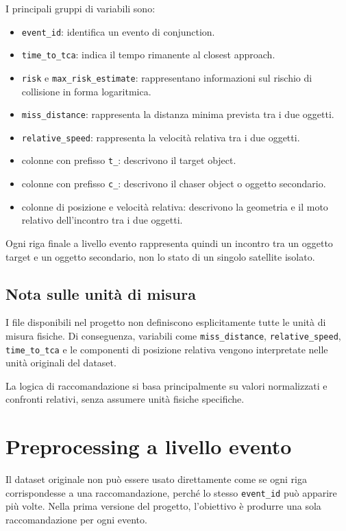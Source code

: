 \documentclass[12pt,a4paper]{article}
\begin{document}
I principali gruppi di variabili sono:

\begin{itemize}
    \item \texttt{event\_id}: identifica un evento di conjunction.
    \item \texttt{time\_to\_tca}: indica il tempo rimanente al closest approach.
    \item \texttt{risk} e \texttt{max\_risk\_estimate}: rappresentano informazioni sul rischio di collisione in forma logaritmica.
    \item \texttt{miss\_distance}: rappresenta la distanza minima prevista tra i due oggetti.
    \item \texttt{relative\_speed}: rappresenta la velocità relativa tra i due oggetti.
    \item colonne con prefisso \texttt{t\_}: descrivono il target object.
    \item colonne con prefisso \texttt{c\_}: descrivono il chaser object o oggetto secondario.
    \item colonne di posizione e velocità relativa: descrivono la geometria e il moto relativo dell'incontro tra i due oggetti.
\end{itemize}

Ogni riga finale a livello evento rappresenta quindi un incontro tra un oggetto target e un oggetto secondario, non lo stato di un singolo satellite isolato.

\subsection{Nota sulle unità di misura}

I file disponibili nel progetto non definiscono esplicitamente tutte le unità di misura fisiche. Di conseguenza, variabili come \texttt{miss\_distance}, \texttt{relative\_speed}, \texttt{time\_to\_tca} e le componenti di posizione relativa vengono interpretate nelle unità originali del dataset.

La logica di raccomandazione si basa principalmente su valori normalizzati e confronti relativi, senza assumere unità fisiche specifiche.

\section{Preprocessing a livello evento}

Il dataset originale non può essere usato direttamente come se ogni riga corrispondesse a una raccomandazione, perché lo stesso \texttt{event\_id} può apparire più volte. Nella prima versione del progetto, l'obiettivo è produrre una sola raccomandazione per ogni evento.
\end{document}
